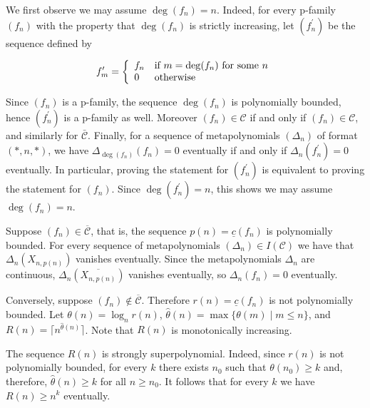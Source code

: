 We first observe we may assume $\deg(f_{n})=n$. Indeed, for every p-family $(f_{n})$ with the property that $\deg(f_{n})$ is strictly increasing, let $(f^{\prime}_{n})$ be the sequence defined by



\[\begin{aligned}
f^{\prime}_{m}=\left\{\begin{array}[]{ll}f_{n}&\text{if $m=\deg(f_{n})$ for some $n$}\\ 0&\text{otherwise}\end{array}\right.
\end{aligned}\]


Since $(f_{n})$ is a p-family, the sequence $\deg(f_{n})$ is polynomially bounded, hence $(f^{\prime}_{n})$ is a p-family as well. Moreover $(f_{n})\in\mathcal{C}$ if and only if $(f_{n})\in\mathcal{C}$, and similarly for $\bar{\mathcal{C}}$. Finally, for a sequence of metapolynomials $(\Delta_{n})$ of format $(*,n,*)$, we have $\Delta_{\deg(f_{n})}(f_{n})=0$ eventually if and only if $\Delta_{n}(f^{\prime}_{n})=0$ eventually. In particular, proving the statement for $(f^{\prime}_{n})$ is equivalent to proving the statement for $(f_{n})$. Since $\deg(f^{\prime}_{n})=n$, this shows we may assume $\deg(f_{n})=n$.





Suppose $(f_{n})\in\overline{\mathcal{C}}$, that is, the sequence $p(n)=\underline{c}(f_{n})$ is polynomially bounded.
For every sequence of metapolynomials $(\Delta_{n})\in I(\mathcal{C})$ we have that $\Delta_{n}(X_{n,p(n)})$ vanishes eventually.
Since the metapolynomials $\Delta_{n}$ are continuous, $\Delta_{n}(\overline{X_{n,p(n)}})$ vanishes eventually, so $\Delta_{n}(f_{n})=0$ eventually.





Conversely, suppose $(f_{n})\notin\overline{\mathcal{C}}$. Therefore $r(n)=\underline{c}(f_{n})$ is not polynomially bounded. Let $\theta(n)=\log_{n}r(n)$, $\hat{\theta}(n)=\max\{\theta(m)\mid m\leq n\}$, and $R(n)=\lceil n^{\hat{\theta}(n)}\rceil$. Note that $R(n)$ is monotonically increasing.





The sequence $R(n)$ is strongly superpolynomial.
Indeed, since $r(n)$ is not polynomially bounded, for every $k$ there exists $n_{0}$ such that $\theta(n_{0})\geq k$ and, therefore, $\hat{\theta}(n)\geq k$ for all $n\geq n_{0}$.
It follows that for every $k$ we have $R(n)\geq n^{k}$ eventually.





